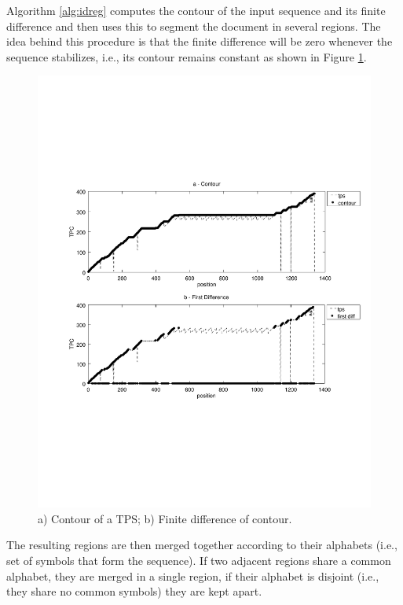 \documentclass{vldb}
\begin{document}
Algorithm \ref{alg:idreg} computes the contour of the input sequence and its
finite difference and then uses this to segment the document in several regions.
The idea behind this procedure is that the finite difference will be zero
whenever the sequence stabilizes, i.e., its contour remains constant as shown in
Figure \ref{fig:contour}.

\begin{figure}[h]
  \centering
     \includegraphics[trim={2.5cm 7.5cm 1cm 6.5cm}, width=\linewidth
     ]{img/contour.pdf}
  \caption{a) Contour of a TPS; b) Finite difference of contour.}
  \label{fig:contour}
\end{figure}

The resulting regions are then merged together according to their alphabets
(i.e., set of symbols that form the sequence). If two adjacent regions share a
common alphabet, they are merged in a single region, if their alphabet is
disjoint (i.e., they share no common symbols) they are kept apart.
\end{document}
